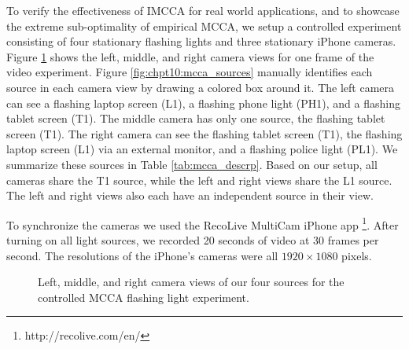 To verify the effectiveness of IMCCA for real world applications, and to showcase the
extreme sub-optimality of empirical MCCA, we setup a controlled experiment consisting of
four stationary flashing lights and three stationary iPhone cameras. Figure
\ref{fig:chpt10:mcca_setup} shows the left, middle, and right camera views for one frame
of the video experiment. Figure \ref{fig:chpt10:mcca_sources} manually identifies each
source in each camera view by drawing a colored box around it. The left camera can see a
flashing laptop screen (L1), a flashing phone light (PH1), and a flashing tablet screen
(T1). The middle camera has only one source, the flashing tablet screen (T1). The right
camera can see the flashing tablet screen (T1), the flashing laptop screen (L1) via an
external monitor, and a flashing police light (PL1). We summarize these sources in Table
\ref{tab:mcca_descrp}. Based on our setup, all cameras share the T1 source, while the left
and right views share the L1 source. The left and right views also each have an
independent source in their view.

To synchronize the cameras we used the RecoLive MultiCam iPhone app
\footnote{http://recolive.com/en/}. After turning on all light sources, we recorded
20 seconds of video at 30 frames per second. The resolutions of the iPhone's cameras were
all $1920\times 1080$ pixels. 

\begin{figure}
  \begin{center}
    \caption{Left, middle, and right camera views of our four sources for the controlled
      MCCA flashing light experiment.}
    \label{fig:chpt10:mcca_setup}
  \end{center}
\end{figure}

